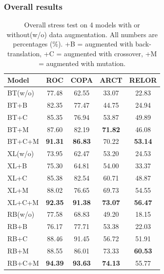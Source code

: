 \subsubsection{Overall results}
\label{sec:overview}

\begin{table}[th]
    \scriptsize
    \centering
        \begin{tabular}{l|c|c|c|c} \toprule
            \textbf{Model} &\bf{ROC} &\bf{COPA} & \bf{ARCT} & \bf{RELOR} \\ \midrule
BT(w/o)&77.48 &62.55&33.07 &22.83 \\
BT+B&82.35 &77.47 &44.75 & 24.94\\
BT+C&85.35 &76.94 &53.87 & 49.89\\
BT+M&87.60 &82.19 &\textbf{71.82} &46.08 \\
BT+C+M&\textbf{91.31}&\textbf{86.83}&70.22 &\textbf{53.14} \\
            \midrule
XL(w/o)&73.95 &62.47 &53.20 & 24.53\\
XL+B &75.30 &64.81 &54.00 & 33.37 \\
XL+C &85.38 &82.54 &60.71 & 48.87 \\
XL+M &88.02 &76.65 &69.73 & 54.55\\
XL+C+M & \textbf{92.35} &\textbf{91.38} &\textbf{73.07} & \textbf{56.47}\\
            \midrule
RB(w/o)&77.58 &68.83 &49.20 &18.15\\
RB+B &76.17 &77.71 &53.38 & 22.03\\
RB+C &88.46 &91.45 &56.72 & 51.91\\
RB+M&88.55 &86.01 &73.33 & \textbf{60.53}\\
RB+C+M &\textbf{94.39} &\textbf{93.63} &\textbf{74.13} &55.77 \\
            \bottomrule
        \end{tabular}
    \caption{\label{tab:stressresults} Overall stress test
        on 4 models with or without(w/o) data augmentation.
        All numbers are percentages (\%). 
        +B = augmented with back-translation,
        +C = augmented with crossover, +M = augmented with mutation.}
\end{table}

